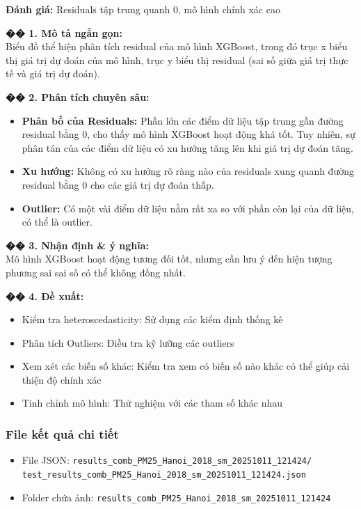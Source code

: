 \documentclass[12pt,a4paper]{article}
\begin{document}
\begin{aibox}
\textbf{Đánh giá:} Residuals tập trung quanh 0, mô hình chính xác cao

\textbf{�� 1. Mô tả ngắn gọn:}\\
Biểu đồ thể hiện phân tích residual của mô hình XGBoost, trong đó trục x biểu thị giá trị dự đoán của mô hình, trục y biểu thị residual (sai số giữa giá trị thực tế và giá trị dự đoán).

\textbf{�� 2. Phân tích chuyên sâu:}
\begin{itemize}
    \item \textbf{Phân bố của Residuals:} Phần lớn các điểm dữ liệu tập trung gần đường residual bằng 0, cho thấy mô hình XGBoost hoạt động khá tốt. Tuy nhiên, sự phân tán của các điểm dữ liệu có xu hướng tăng lên khi giá trị dự đoán tăng.
    \item \textbf{Xu hướng:} Không có xu hướng rõ ràng nào của residuals xung quanh đường residual bằng 0 cho các giá trị dự đoán thấp.
    \item \textbf{Outlier:} Có một vài điểm dữ liệu nằm rất xa so với phần còn lại của dữ liệu, có thể là outlier.
\end{itemize}

\textbf{�� 3. Nhận định \& ý nghĩa:}\\
Mô hình XGBoost hoạt động tương đối tốt, nhưng cần lưu ý đến hiện tượng phương sai sai số có thể không đồng nhất.

\textbf{�� 4. Đề xuất:}
\begin{itemize}
    \item Kiểm tra heteroscedasticity: Sử dụng các kiểm định thống kê
    \item Phân tích Outliers: Điều tra kỹ lưỡng các outliers
    \item Xem xét các biến số khác: Kiểm tra xem có biến số nào khác có thể giúp cải thiện độ chính xác
    \item Tinh chỉnh mô hình: Thử nghiệm với các tham số khác nhau
\end{itemize}
\end{aibox}

\subsubsection{File kết quả chi tiết}
\begin{itemize}
    \item File JSON: \texttt{results\_comb\_PM25\_Hanoi\_2018\_sm\_20251011\_121424/}\\
    \texttt{test\_results\_comb\_PM25\_Hanoi\_2018\_sm\_20251011\_121424.json}
    \item Folder chứa ảnh: \texttt{results\_comb\_PM25\_Hanoi\_2018\_sm\_20251011\_121424}
\end{itemize}
\end{document}
